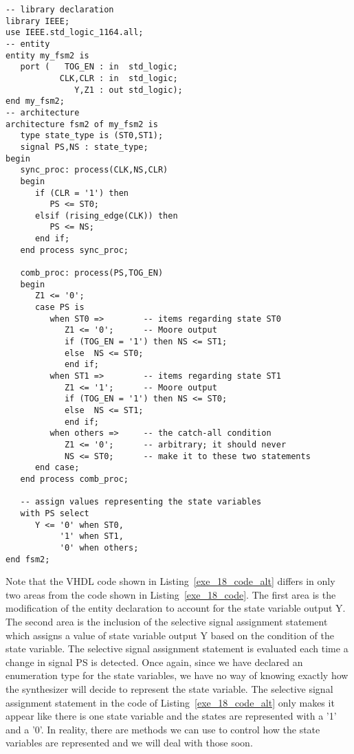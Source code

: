 \noindent
\begin{minipage}{0.99\linewidth}
\begin{lstlisting}[label=exe_18_code_alt, caption=Solution to Example~18 that include state variable as output.]
-- library declaration
library IEEE;
use IEEE.std_logic_1164.all;
-- entity
entity my_fsm2 is 
   port (   TOG_EN : in  std_logic; 
           CLK,CLR : in  std_logic; 
              Y,Z1 : out std_logic); 
end my_fsm2;
-- architecture
architecture fsm2 of my_fsm2 is
   type state_type is (ST0,ST1); 
   signal PS,NS : state_type; 
begin
   sync_proc: process(CLK,NS,CLR)
   begin
      if (CLR = '1') then 
         PS <= ST0; 
      elsif (rising_edge(CLK)) then 
         PS <= NS; 
      end if; 
   end process sync_proc; 

   comb_proc: process(PS,TOG_EN)
   begin
      Z1 <= '0';
      case PS is    
         when ST0 =>        -- items regarding state ST0
            Z1 <= '0';      -- Moore output
            if (TOG_EN = '1') then NS <= ST1; 
            else  NS <= ST0; 
            end if; 
         when ST1 =>        -- items regarding state ST1
            Z1 <= '1';      -- Moore output
            if (TOG_EN = '1') then NS <= ST0; 
            else  NS <= ST1; 
            end if; 
         when others =>     -- the catch-all condition
            Z1 <= '0';      -- arbitrary; it should never 
            NS <= ST0;      -- make it to these two statements
      end case; 
   end process comb_proc; 
 
   -- assign values representing the state variables
   with PS select
      Y <= '0' when ST0, 
           '1' when ST1, 
           '0' when others; 
end fsm2;
\end{lstlisting}
\end{minipage}

Note that the VHDL code shown in Listing~\ref{exe_18_code_alt} differs in only two areas from the code shown in Listing~\ref{exe_18_code}. The first area is the modification of the entity declaration to account for the state variable output Y. The second area is the inclusion of the selective signal assignment statement which assigns a value of state variable output Y based on the condition of the state variable. The selective signal assignment statement is evaluated each time a change in signal PS is detected. Once again, since we have declared an enumeration type for the state variables, we have no way of knowing exactly how the synthesizer will decide to represent the state variable. The selective signal assignment statement in the code of Listing~\ref{exe_18_code_alt} only makes it appear like there is one state variable and the states are represented with a '1' and a '0'. In reality, there are methods we can use to control how the state variables are represented and we will deal with those soon. 


